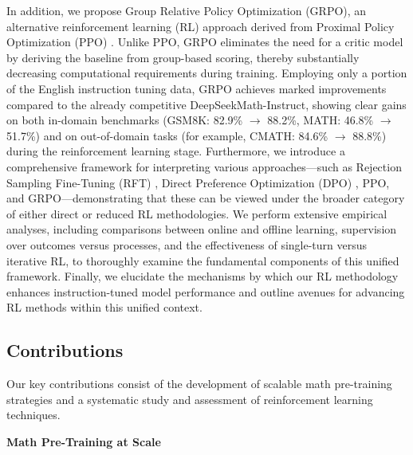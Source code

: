 In addition, we propose Group Relative Policy Optimization (GRPO), an alternative reinforcement learning (RL) approach derived from Proximal Policy Optimization (PPO) \citep{schulman2017proximal}. Unlike PPO, GRPO eliminates the need for a critic model by deriving the baseline from group-based scoring, thereby substantially decreasing computational requirements during training. Employing only a portion of the English instruction tuning data, GRPO achieves marked improvements compared to the already competitive DeepSeekMath-Instruct, showing clear gains on both in-domain benchmarks (GSM8K: 82.9\% $\rightarrow$ 88.2\%, MATH: 46.8\% $\rightarrow$ 51.7\%) and on out-of-domain tasks (for example, CMATH: 84.6\% $\rightarrow$ 88.8\%) during the reinforcement learning stage. Furthermore, we introduce a comprehensive framework for interpreting various approaches—such as Rejection Sampling Fine-Tuning (RFT) \citep{yuan2023scaling}, Direct Preference Optimization (DPO) \citep{dpo}, PPO, and GRPO—demonstrating that these can be viewed under the broader category of either direct or reduced RL methodologies. We perform extensive empirical analyses, including comparisons between online and offline learning, supervision over outcomes versus processes, and the effectiveness of single-turn versus iterative RL, to thoroughly examine the fundamental components of this unified framework. Finally, we elucidate the mechanisms by which our RL methodology enhances instruction-tuned model performance and outline avenues for advancing RL methods within this unified context.

\subsection{Contributions}
Our key contributions consist of the development of scalable math pre-training strategies and a systematic study and assessment of reinforcement learning techniques.

\textbf{Math Pre-Training at Scale}

